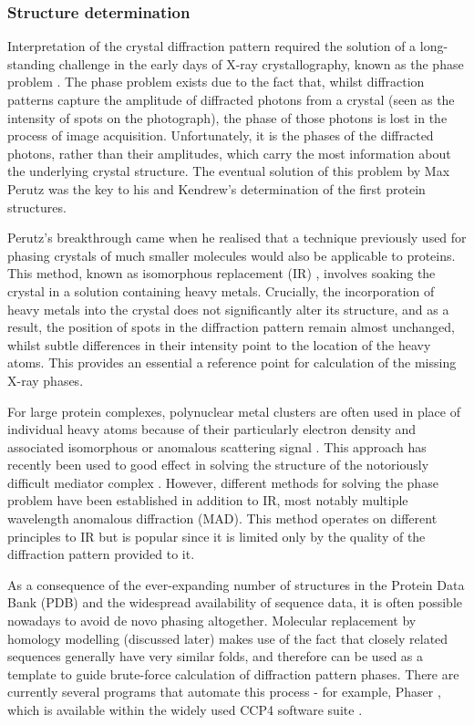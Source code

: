 \documentclass[a4paper,11pt,twoside,openright]{scrbook}
\begin{document}
\subsubsection{Structure determination}
Interpretation of the crystal diffraction pattern required the solution of a long-standing challenge in the early days of X-ray crystallography, known as the phase problem \cite{Taylor2003}. The phase problem exists due to the fact that, whilst diffraction patterns capture the amplitude of diffracted photons from a crystal (seen as the intensity of spots on the photograph), the phase of those photons is lost in the process of image acquisition. Unfortunately, it is the phases of the diffracted photons, rather than their amplitudes, which carry the most information about the underlying crystal structure. The eventual solution of this problem by Max Perutz was the key to his and Kendrew's determination of the first protein structures.

Perutz's breakthrough came when he realised that a technique previously used for phasing crystals of much smaller molecules would also be applicable to proteins. This method, known as isomorphous replacement (IR)  \cite{Robertson1936}, involves soaking the crystal in a solution containing heavy metals. Crucially, the incorporation of heavy metals into the crystal does not significantly alter its structure, and as a result, the position of spots in the diffraction pattern remain almost unchanged, whilst subtle differences in their intensity point to the location of the heavy atoms. This provides an essential a reference point for calculation of the missing X-ray phases.

For large protein complexes, polynuclear metal clusters are often used in place of individual heavy atoms because of their particularly electron density and associated isomorphous or anomalous scattering signal \cite{Dauter2005}. This approach has recently been used to good effect in solving the structure of the notoriously difficult mediator complex \cite{Nozawa2017}. However, different methods for solving the phase problem have been established in addition to IR, most notably multiple wavelength anomalous diffraction \cite{Hendrickson1991} (MAD). This method operates on different principles to IR but is popular since it is limited only by the quality of the diffraction pattern provided to it.

As a consequence of the ever-expanding number of structures in the Protein Data Bank \cite{Berman2000} (PDB) and the widespread availability of sequence data, it is often possible nowadays to avoid de novo phasing altogether. Molecular replacement by homology modelling (discussed later) makes use of the fact that closely related sequences generally have very similar folds, and therefore can be used as a template to guide brute-force calculation of diffraction pattern phases. There are currently several programs that automate this process - for example, Phaser \cite{McCoy2007}, which is available within the widely used CCP4 software suite \cite{Winn2011}.
\end{document}
